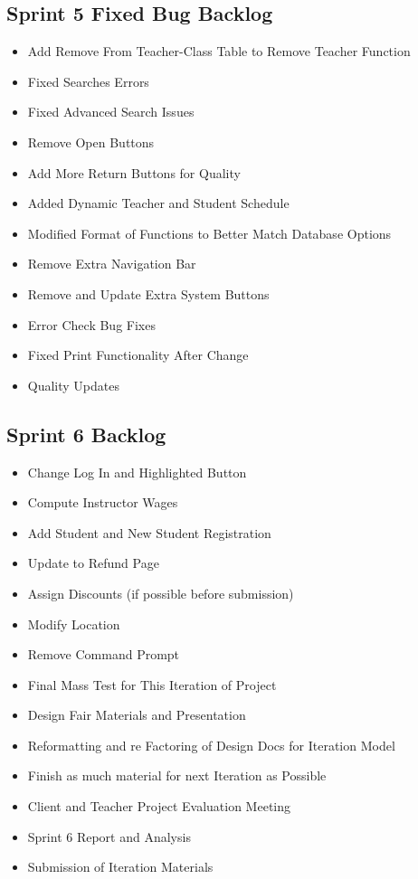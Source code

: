 \subsection{Sprint 5 Fixed Bug Backlog}
\begin{itemize}
\item Add Remove From Teacher-Class Table to Remove Teacher Function
\item Fixed Searches Errors
\item Fixed Advanced Search Issues 
\item Remove Open Buttons
\item Add More Return Buttons for Quality 
\item Added Dynamic Teacher and Student Schedule
\item Modified Format of Functions to Better Match Database Options 
\item Remove Extra Navigation Bar
\item Remove and Update Extra System Buttons
\item Error Check Bug Fixes
\item Fixed Print Functionality After Change
\item Quality Updates 
\end{itemize}


\subsection{Sprint 6 Backlog}
\begin{itemize}
\item Change Log In and Highlighted Button
\item Compute Instructor Wages
\item Add Student and New Student Registration 
\item Update to Refund Page
\item Assign Discounts (if possible before submission) 
\item Modify Location
\item Remove Command Prompt 
\item Final Mass Test for This Iteration of Project
\item Design Fair Materials and Presentation
\item Reformatting and re Factoring of Design Docs for Iteration Model
\item Finish as much material for next Iteration as Possible
\item Client and Teacher Project Evaluation Meeting
\item Sprint 6 Report and Analysis
\item Submission of Iteration Materials 
\end{itemize}   


